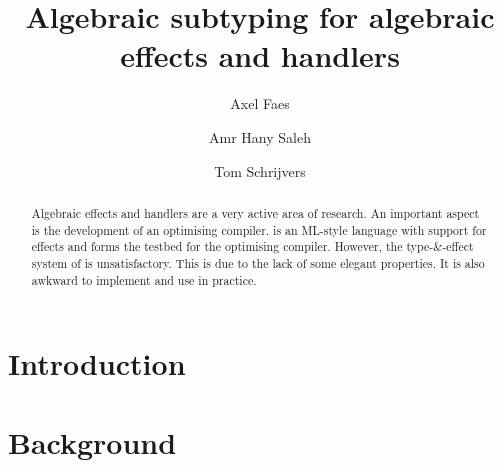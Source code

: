 \documentclass[acmsmall,10pt]{acmart}\settopmatter{printfolios=true}
\begin{document}
\title{Algebraic subtyping for algebraic effects and handlers}

\author{Axel Faes}

\author{Amr Hany Saleh}

\author{Tom Schrijvers}


\begin{abstract}
Algebraic effects and handlers are a very active area of research. An important aspect is the development of an optimising compiler. \eff is an ML-style language with support for effects and forms the testbed for the optimising compiler. However, the type-\&-effect system of \eff is unsatisfactory. This is due to the lack of some elegant properties. It is also awkward to implement and use in practice.
\end{abstract}

\maketitle

\tableofcontents

\listoffigures
\listoftables

\section{Introduction}


\section{Background}

\end{document}
